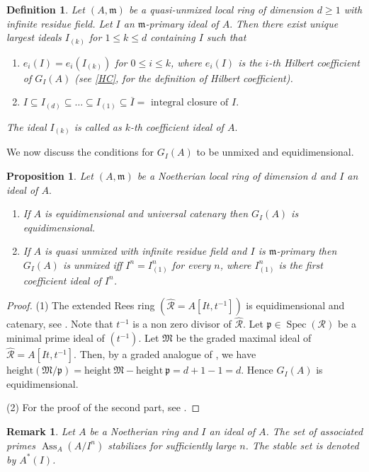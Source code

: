 \documentclass[11pt]{amsart}
\theoremstyle{plain}
\newtheorem{proposition}[theorem]{Proposition}
\newtheorem{remark}[theorem]{Remark}
\newtheorem{definition}[theorem]{Definition}
\newcommand{\p}{\mathfrak{p}}
\newcommand{\m}{\mathfrak{m}}
\newcommand{\R}{\mathcal{R}}
\newcommand{\Spec}{\operatorname{Spec}}
\theoremstyle{plain}
\begin{document}
\begin{definition}\cite[Theorem 1]{kishor}
\normalfont
    Let $(A,\m)$ be a quasi-unmixed local ring of dimension $d\geq 1$ with infinite residue field. Let $I$ an $\m$-primary ideal of $A.$ Then there exist unique largest ideals $I_{(k)}$ for $1\leq k\leq d$ containing $I$ such that
    \begin{enumerate}
        \item $e_i(I)=e_i(I_{(k)})$ for $0\leq i\leq k$, where $e_i(I)$ is the $i$-th Hilbert coefficient of $G_I(A)$ (see \ref{HC}, for the definition of Hilbert coefficient).
        \item $I\subseteq I_{(d)}\subseteq \ldots \subseteq I_{(1)}\subseteq \overline{I}=\text{ integral closure of }I.$
    \end{enumerate}
    The ideal $I_{(k)}$ is called as $k$-th coefficient ideal of $A.$
\end{definition}
We now discuss the conditions for $G_I(A)$ to be unmixed and equidimensional.
\begin{proposition}
\label{UE}
     Let $(A,\m)$ be a Noetherian local ring of dimension $d$ and $I$ an ideal of $A.$
    \begin{enumerate}[\rm (1)]
     \item If $A$ is equidimensional and universal catenary then $G_{I}(A)$ is equidimensional.
        \item If $A$ is quasi unmixed with infinite residue field  and $I$ is $\m$-primary then  $G_{I}(A)$ is unmixed iff $I^n=I^n_{(1)}$ for every $n$, where $I^n_{(1)}$ is the first coefficient ideal of $I^n$.
    \end{enumerate}
\end{proposition}
\begin{proof}
     (1) The extended Rees ring $(\hat{\R}=A[It,t^{-1}])$ is equidimensional and catenary, see \cite[ Lemma 4.5.5]{Bruns}. Note that $t^{-1}$ is a non zero divisor of $\hat{\R}$. Let $\p \in {\Spec}(\R)$ be a minimal prime ideal of $(t^{-1}).$  Let $\mathfrak{M}$ be the graded maximal ideal of $\hat{\R}=A[It,t^{-1}]$.
     Then, by a graded analogue of \cite[Lemma 2, p.\ 250]{matsumura}, we have $\text{height}(\mathfrak{M}/\p) = \text{height}\ \mathfrak{M} - \text{height} \ \p = d+1 -1 = d$.
      Hence $G_I(A)$ is equidimensional.

      (2) For the proof of the second part, see \cite[Theorem 4]{kishor}.
\end{proof}

\begin{remark}\cite{Brodmann}
    Let $A$ be a Noetherian ring and $I$ an ideal of $A$. The set of associated primes $\operatorname{Ass}_A(A/I^n)$ stabilizes for sufficiently large $n$. The stable set is denoted by $A^*(I)$.
\end{remark}
\end{document}
